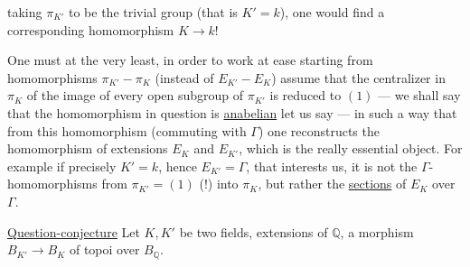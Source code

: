 taking $\pi_{K'}$ to be the trivial group (that is $K'=k$), one would find a corresponding homomorphism $K\longrightarrow k$!

One must at the very least, in order to work at ease starting from homomorphisms $\pi_{K'}-\pi_K$ (instead of $E_{K'}-E_K$) assume that the centralizer in $\pi_K$ of the image of every open subgroup of $\pi_{K'}$ is reduced to $(1)$ --- we shall say that the homomorphism in question is \uline{anabelian} let us say --- in such a way that from this homomorphism (commuting with $\Gamma$) one reconstructs the homomorphism of extensions $E_K$ and $E_{K'}$, which is the really essential object. For example if precisely $K'=k$, hence $E_{K'}=\Gamma$, that  interests us, it is not the $\Gamma$-homomorphisms from $\pi_{K'}=(1)$ (!) into $\pi_K$, but rather the \uline{sections} of $E_K$ over $\Gamma$.

\uline{Question-conjecture} Let $K,K'$ be two fields,  extensions of $\mathbb Q$,   a morphism $B_{K'}\longrightarrow B_K$ of topoi over $B_{\mathbb Q}$.
